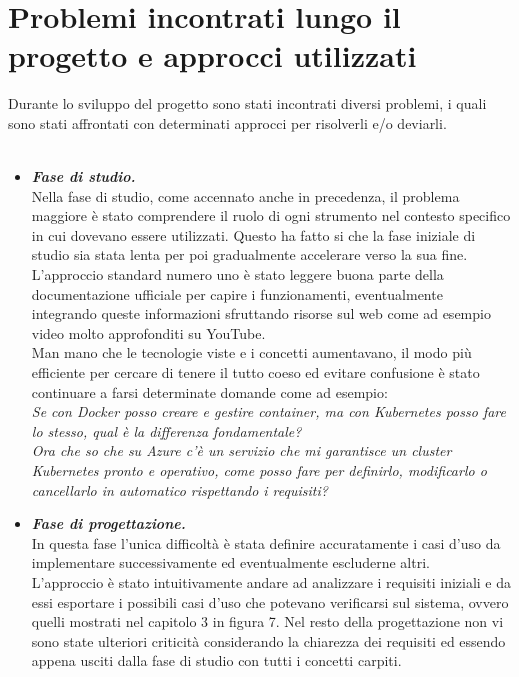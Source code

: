 \documentclass[a4paper,12pt]{report}
\begin{document}
\section{Problemi incontrati lungo il progetto e approcci utilizzati}
Durante lo sviluppo del progetto sono stati incontrati diversi problemi, i quali sono stati affrontati con determinati approcci per risolverli e/o deviarli.\\ \\
\begin{itemize}
\item \textit{\textbf{Fase di studio.}}\\
Nella fase di studio, come accennato anche in precedenza, il problema maggiore è stato comprendere il ruolo di ogni strumento nel contesto specifico in cui dovevano essere utilizzati. Questo ha fatto si che la fase iniziale di studio sia stata lenta per poi gradualmente accelerare verso la sua fine.\\
L'approccio standard numero uno è stato leggere buona parte della documentazione ufficiale per capire i funzionamenti, eventualmente integrando queste informazioni sfruttando risorse sul web come ad esempio video molto approfonditi su YouTube.\cite{youtubek8s}\\
Man mano che le tecnologie viste e i concetti aumentavano, il modo più efficiente per cercare di tenere il tutto coeso ed evitare confusione è stato continuare a farsi determinate domande come ad esempio: \\ \textit{Se con Docker posso creare e gestire container, ma con Kubernetes posso fare lo stesso, qual è la differenza fondamentale?} \\ \textit{Ora che so che su Azure c'è un servizio che mi garantisce un cluster Kubernetes pronto e operativo, come posso fare per definirlo, modificarlo o cancellarlo in automatico rispettando i requisiti?} \\
\item \textit{\textbf{Fase di progettazione.}}\\
In questa fase l'unica difficoltà è stata definire accuratamente i casi d'uso da implementare successivamente ed eventualmente escluderne altri.\\
L'approccio è stato intuitivamente andare ad analizzare i requisiti iniziali e da essi esportare i possibili casi d'uso che potevano verificarsi sul sistema, ovvero quelli mostrati nel capitolo 3 in figura 7. Nel resto della progettazione non vi sono state ulteriori criticità considerando la chiarezza dei requisiti ed essendo appena usciti dalla fase di studio con tutti i concetti carpiti.\\

\end{itemize}
\end{document}
